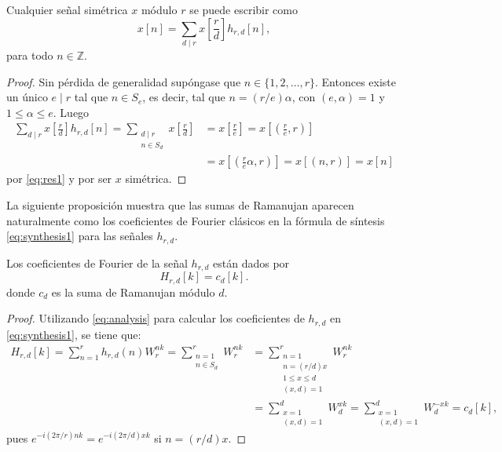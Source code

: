 \begin{proposition}\label{prop:fou2}
Cualquier señal simétrica $x$ módulo $r$ se puede escribir como
\begin{equation}\label{eq:res2}
    x[n] = \sum_{d \mid r} x \left[ \frac{r}{d} \right] h_{r,d}[n],
\end{equation}
para todo $n \in \mathbb{Z}$.
\end{proposition}

\begin{proof}
Sin pérdida de generalidad supóngase que $n \in \{ 1,2,\ldots,r \}$. Entonces existe un único $e \mid r$ tal que $n \in S_e$, es decir, tal que $n = (r/e) \alpha$, con $(e,\alpha)=1$ y $1 \le \alpha \le e$. Luego
\begin{align*}
    \sum_{d \mid r} x \left[ \frac{r}{d} \right] h_{r,d}[n] = \sum_{\substack{d \mid r \\ n \in S_d}} x \left[ \frac{r}{d} \right] & = x \left[ \frac{r}{e} \right] = x \left[ \left( \frac{r}{e},r \right) \right] \\
                                                            & = x \left[ \left( \frac{r}{e} \alpha,r \right) \right] = x [(n,r)] = x[n]
\end{align*}
por \eqref{eq:res1} y por ser $x$ simétrica.
\end{proof}

La siguiente proposición muestra que las sumas de Ramanujan aparecen naturalmente como los coeficientes de Fourier clásicos en la fórmula de síntesis \eqref{eq:synthesis1} para las señales $h_{r,d}$.

\begin{proposition}
Los coeficientes de Fourier de la señal $h_{r,d}$ están dados por
\begin{equation*}
    H_{r,d}[k] =  c_d[k].
\end{equation*}
donde $c_d$ es la suma de Ramanujan módulo $d$.
\end{proposition}

\begin{proof}
Utilizando \eqref{eq:analysis} para calcular los coeficientes de $h_{r,d}$ en \eqref{eq:synthesis1}, se tiene que:
\begin{equation}\label{eq:res3}
\begin{split}
    H_{r,d}[k] = \sum_{n=1}^{r} h_{r,d}(n) W_r^{n k} = \sum_{\substack{n=1 \\ n \in S_d}}^{r} W_r^{n k} & = \sum_{\substack{n=1 \\ n=(r/d) x \\ 1 \le x \le d \\ (x,d)=1}}^{r} W_r^{n k} \\
    &= \sum_{\substack{x = 1 \\ (x,d)=1}}^{d} W_d^{x k} = \sum_{\substack{x = 1 \\ (x,d)=1}}^{d} W_d^{-x k}  = c_d[k],
\end{split}
\end{equation}
pues $e^{-i(2 \pi /r) n k}=e^{-i (2 \pi /d) x k}$ si $n=(r/d)x$.
\end{proof}


